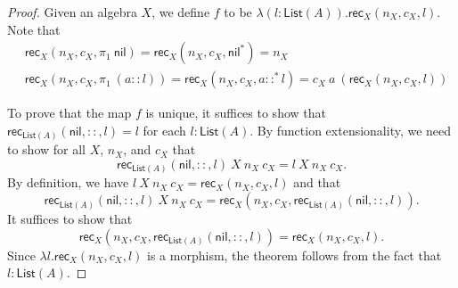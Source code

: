 \documentclass[10pt,a4paper]{amsart}
\newcommand{\Cons}[2]{#1 \ConsSym #2}
\newcommand{\ConsI}[2]{#1 \ConsSym^* #2}
\newcommand{\ConsSym}{::}
\newcommand{\List}[1]{\mathsf{List}(#1)}
\newcommand{\Nil}{\mathsf{nil}}
\newcommand{\NilI}{\mathsf{nil}^*}
\newcommand{\Rec}[4]{\mathsf{rec}_{#1}(#2, #3, #4)}
\newcommand{\projl}[1]{\pi_1 \> #1}
\begin{document}
\begin{proof}
Given an algebra $X$,
we define $f$ to be $\lambda (l : \List{A}) . \Rec{X}{n_X}{c_X}{l}$.
Note that
\begin{align*}
&\Rec{X}{n_X}{c_X}{\projl{\Nil}} = \Rec{X}{n_X}{c_X}{\NilI} = n_X
\\
&\Rec{X}{n_X}{c_X}{\projl{(\Cons{a}{l})}} = \Rec{X}{n_X}{c_X}{\ConsI{a}{l}} = c_X \> a \> (\Rec{X}{n_X}{c_X}{l})
\end{align*}

To prove that the map $f$ is unique,
it suffices to show that $\Rec{\List{A}}{\Nil}{\ConsSym}{l} = l$
for each $l : \List{A}$.
By function extensionality,
we need to show for all $X$, $n_X$, and $c_X$ that
\[
\Rec{\List{A}}{\Nil}{\ConsSym}{l} \> X \> n_X \> c_X = l \> X \> n_X \> c_X.
\]
By definition,
we have $l \> X \> n_X \> c_X = \Rec{X}{n_X}{c_X}{l}$
and that
\[
\Rec{\List{A}}{\Nil}{\ConsSym}{l} \> X \> n_X \> c_X
=
\Rec{X}{n_X}{c_X}{\Rec{\List{A}}{\Nil}{\ConsSym}{l}}.
\]
It suffices to show that
\[
\Rec{X}{n_X}{c_X}{\Rec{\List{A}}{\Nil}{\ConsSym}{l}} 
=
\Rec{X}{n_X}{c_X}{l}.
\]
Since $\lambda l. \Rec{X}{n_X}{c_X}{l}$ is a morphism,
the theorem follows from the fact that $l : \List{A}$.
\end{proof}
\end{document}
